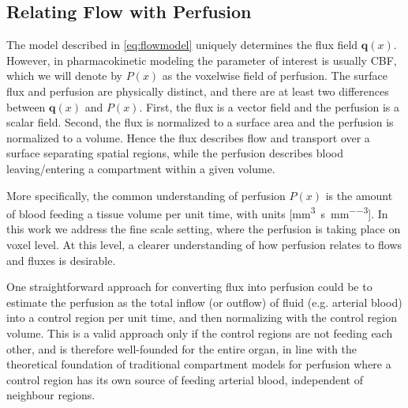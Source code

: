 \documentclass[journal,twocolumn]{IEEEtran}
\newcommand{\Perf}{P}
\newcommand{\vq}{\mathbf{q}}
\newcommand{\siQmm}{\milli\meter\cubed\per\second\per\milli\meter\cubed}
\begin{document}

	\subsection{Relating Flow with Perfusion}\label{sec:flux2perf}
	The model described in \eqref{eq:flowmodel} uniquely determines the flux field $\vq(x)$. 
	However, in pharmacokinetic modeling the parameter of interest is usually CBF, which we will denote by $\Perf (x)$ as the voxelwise field of perfusion. The surface flux and perfusion are physically distinct, and there are at least two differences between $\vq(x)$ and $\Perf (x)$. 
	First, the flux is a vector field and the perfusion is a scalar field. 
	Second, the flux is normalized to a surface area and the perfusion is normalized to a volume. 
	Hence the flux describes flow and transport over a surface separating spatial regions, while the perfusion describes blood leaving/entering a compartment within a given volume. 

	

	More specifically,
	the common understanding of perfusion
	 $\Perf (x)$ is the amount of blood feeding a tissue volume per unit time, with units [\si{\siQmm}]. 
	 In this work we address the  fine scale setting, where the perfusion is taking place on voxel level. At this level, a clearer understanding of how perfusion relates to flows and fluxes is desirable.  

	One straightforward approach for converting flux into perfusion could be to estimate the perfusion as the total inflow (or outflow) of fluid (e.g. arterial blood) into a control region per unit time, and then normalizing with the control region volume. 
	This is a valid approach only if the control regions are not feeding each other, and is therefore well-founded for the entire organ,
	in line with the theoretical foundation of traditional compartment models for perfusion where a control region has its own source of feeding arterial blood, independent of neighbour regions. 
\end{document}
